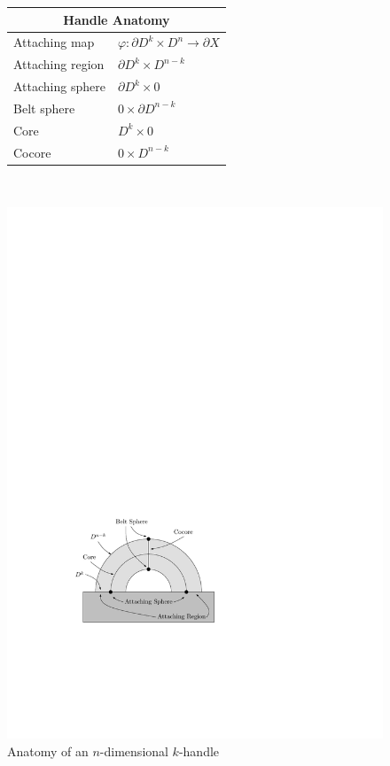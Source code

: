 \begin{figure}[tb]
\centering
\begin{tabular}{|l|l|}
\hline
\multicolumn{2}{|c|}{Handle Anatomy} \\
\hline
Attaching map & $\varphi : \partial D^k \times D^n \rightarrow \partial X$ \\
\hline
Attaching region & $\partial D^k \times D^{n-k}$ \\
\hline
Attaching sphere & $\partial D^k \times 0$ \\
\hline
Belt sphere & $0 \times \partial D^{n-k}$ \\
\hline
Core & $D^k \times 0$ \\
\hline
Cocore & $0 \times D^{n-k}$ \\
\hline
\end{tabular}

\ \linebreak

\includegraphics[scale=1.2]{graphics/handleanatomy}
\caption{Anatomy of an $n$-dimensional $k$-handle}
\label{handle anatomy}
\end{figure}

